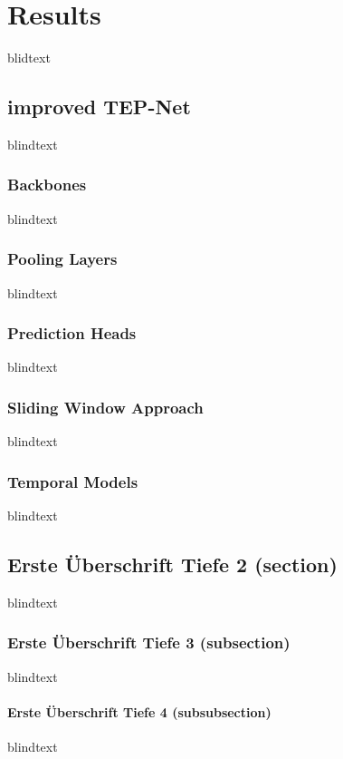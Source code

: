 \chapter{Results}
\label{sec:results}


blidtext







\section{improved TEP-Net}
blindtext

\subsection{Backbones}
blindtext

\subsection{Pooling Layers}
blindtext

\subsection{Prediction Heads}
blindtext

\subsection{Sliding Window Approach}
blindtext

\subsection{Temporal Models}
blindtext

\section{Erste Überschrift Tiefe 2 (section)}
blindtext

\subsection{Erste Überschrift Tiefe 3 (subsection)}
blindtext

\subsubsection{Erste Überschrift Tiefe 4 (subsubsection)}
blindtext